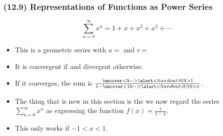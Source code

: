 \begin{frame}
\frametitle{(12.9)  Representations of Functions as Power Series}
\[
\sum_{n=0}^\infty x^n = 1 + x + x^2 + x^3 + \cdots 
\]
\begin{itemize}
\item<2->  This is a geometric series with \alert<handout:0| 2-3,9>{$a = $ } and \alert<handout:0| 4-5,10>{$r = $ }
\item<6->  It is convergent if  and divergent otherwise.
\item<8->  If it converges, the sum is $\frac{\uncover<9->{\alert<handout:0| 9>{1}}}{1 - \uncover<10->{\alert<handout:0| 10>{x}}}$.
\item<11->  The thing that is new in this section is the we now regard the series $\sum_{n=0}^\infty x^n$ as expressing the function $f(x) = \frac{1}{1-x}$.
\item<12->  This only works if $-1 < x < 1$.
\end{itemize}
\end{frame}
